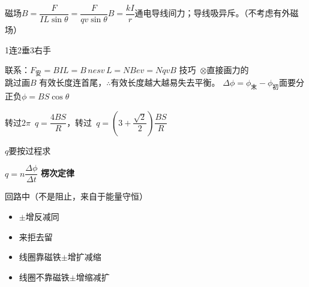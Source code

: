磁场\quad $B=\dfrac{F}{IL\sin\theta}=\dfrac{F}{qv\sin\theta}$\qquad $B=\dfrac{kI}{r}$\quad 通电导线间力；导线吸异斥。（不考虑有外磁场）

1连\quad 2垂\quad 3右手

联系：$F_{\text{安}}=BIL=B\,nesv\,L=NBev=NqvB$
技巧\ $\otimes$\qquad 直接画力的\\
跳过画$B$
有效长度连首尾，$\therefore$有效长度越大越易失去平衡。
$\Delta\phi=\phi_{\text{末}}-\phi_{\text{初}}$\qquad 面要分正负\qquad $\phi=BS\cos\theta$


转过$2\pi$\ $q=\dfrac{4BS}{R}$，转过\ $q=\left(3+\dfrac{\sqrt{2}}{2}\right)\dfrac{BS}{R}$

$q$要按过程求

$q=n\dfrac{\Delta\phi}{\Delta t}$ %
\textbf{楞次定律}

回路中（不是阻止，来自于能量守恒）

\begin{itemize}
\item $\pm$增反减同
\item 来拒去留
\item 线圈靠磁铁\quad $\pm$增扩减缩
\item 线圈不靠磁铁\quad $\pm$增缩减扩
\end{itemize}

